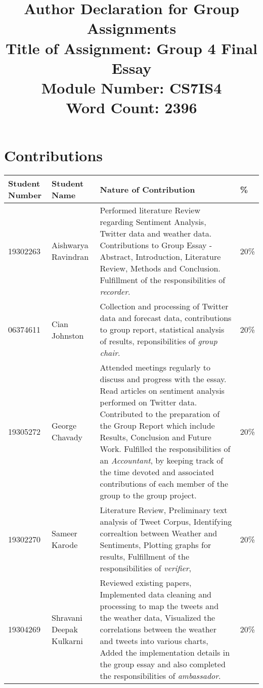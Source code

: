 \documentclass[a4paper,10pt]{article}
\begin{document}
\title{
    Author Declaration for Group Assignments \\
    \small Title of Assignment: Group 4 Final Essay \\
    \small Module Number: CS7IS4 \\
    \small Word Count: 2396
}
\author{}

\maketitle
\section{Contributions}
\begin{tabular}{ | p{2cm} | p{2cm} | p{10cm} | l | }
\hline
Student Number & Student Name & Nature of Contribution & \% \\ \hline
19302263 & Aishwarya Ravindran & Performed literature Review regarding Sentiment Analysis, Twitter data and weather data. Contributions to Group Essay - Abstract, Introduction, Literature Review, Methods and Conclusion. Fulfillment of the responsibilities of \textit{recorder}. & 20\% \\ \hline
06374611 & Cian Johnston & Collection and processing of Twitter data and forecast data, contributions to group report, statistical analysis of results, reponsibilities of \textit{group chair}. & 20\% \\ \hline
19305272 & George Chavady & Attended meetings regularly to discuss and progress with the essay. Read articles on sentiment analysis performed on Twitter data. Contributed to the preparation of the Group Report which include Results, Conclusion and Future Work. Fulfilled the responsibilities of an \textit{Accountant}, by keeping track of the time devoted and associated contributions of each member of the group to the group project. & 20\% \\ \hline
19302270 & Sameer Karode & Literature Review, Preliminary text analysis of Tweet Corpus, Identifying correaltion between Weather and Sentiments, Plotting graphs for results, Fulfillment of the responsibilities of \textit{verifier}, & 20\% \\ \hline
19304269 & Shravani Deepak Kulkarni & Reviewed existing papers, Implemented data cleaning and processing to map the tweets and the weather data, Visualized the correlations between the weather and tweets into various charts, Added the implementation details in the group essay and also completed the responsibilities of \textit{ambassador}. & 20\% \\ \hline
\end{tabular}
\end{document}
